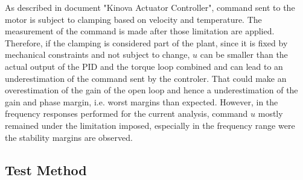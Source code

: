 As described in document "Kinova Actuator Controller", command sent to the motor is subject to clamping based on velocity and temperature. The measurement of the command is made after those limitation are applied. Therefore, if the clamping is considered part of the plant, since it is fixed by mechanical constraints and not subject to change, $u$ can be smaller than the actual output of the PID and the torque loop combined and can lead to an underestimation of the command sent by the controler. That could make an overestimation of the gain of the open loop and hence a underestimation of the gain and phase margin, i.e. worst margins than expected. However, in the frequency responses performed for the current analysis, command $u$ mostly remained under the limitation imposed, especially in the frequency range were the stability margins are observed.


\subsection{Test Method}

